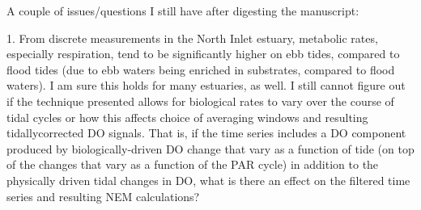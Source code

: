 \documentclass[letterpaper,12pt]{article}\usepackage[]{graphicx}\usepackage[]{color}
\begin{document}
A couple of issues/questions I still have after digesting the manuscript:

1. From discrete measurements in the North Inlet estuary, metabolic rates, especially respiration, tend to be significantly higher on ebb tides, compared to flood tides (due to ebb waters being enriched in substrates, compared to flood waters). I am sure this holds for many estuaries, as well. I still cannot figure out if the technique presented allows for biological rates to vary over the course of tidal cycles or how this affects choice of averaging windows and resulting tidallycorrected DO signals. That is, if the time series includes a DO component produced by biologically-driven DO change that vary as a function of tide (on top of the changes that vary as a function of the PAR cycle) in addition to the physically driven tidal changes in DO, what is there an effect on the filtered time series and resulting NEM calculations?
\end{document}

